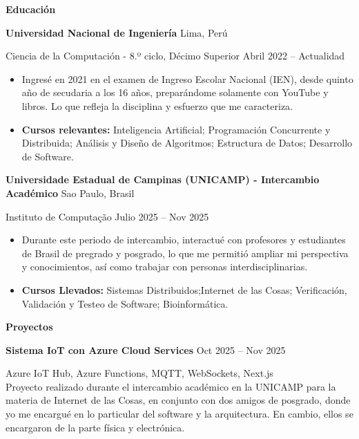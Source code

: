 \documentclass[11pt]{article}
\begin{document}
\vspace{10pt}


\begin{center}
\textbf{Educación}
\end{center}

\textbf{Universidad Nacional de Ingeniería} \hfill Lima, Perú

Ciencia de la Computación - 8.º ciclo, Décimo Superior \hfill Abril 2022 – Actualidad
\begin{itemize}[noitemsep]
\item Ingresé en 2021 en el examen de Ingreso Escolar Nacional (IEN), desde quinto año de secudaria a los 16 años, preparándome solamente con YouTube y libros. Lo que refleja la disciplina y esfuerzo que me caracteriza.
\item \textbf{Cursos relevantes:} Inteligencia Artificial; Programación Concurrente y Distribuida; Análisis y Diseño de Algoritmos; Estructura de Datos; Desarrollo de Software.

\end{itemize}

\textbf{Universidade Estadual de Campinas (UNICAMP) - Intercambio Académico} \hfill Sao Paulo, Brasil

Instituto de Computação \hfill Julio 2025 – Nov 2025
\begin{itemize}[noitemsep]
\item Durante este periodo de intercambio, interactué con profesores y estudiantes de Brasil de pregrado y posgrado, lo que me permitió ampliar mi perspectiva y conocimientos, así como trabajar con personas interdisciplinarias.
\item \textbf{Cursos Llevados:} Sistemas Distribuidos;Internet de las Cosas; Verificación, Validación y Testeo de Software; Bioinformática.
\end{itemize}

\vspace{10pt}


\begin{center}
\textbf{Proyectos}
\end{center}

\textbf{Sistema IoT con Azure Cloud Services} \hfill Oct 2025 – Nov 2025

Azure IoT Hub, Azure Functions, MQTT, WebSockets, Next.js \\

Proyecto realizado durante el intercambio académico en la UNICAMP para la materia de Internet de las Cosas, en conjunto con dos amigos de posgrado, donde yo me encargué en lo particular del software y la arquitectura. En cambio, ellos se encargaron de la parte física y electrónica.
\end{document}
